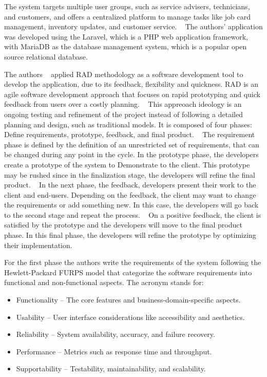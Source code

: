 The system targets multiple user groups, such as service advisers, technicians, and customers, and offers a centralized platform to manage tasks like job card management, inventory updates, and customer service. ~\cite{MAS_MOTORS}
The authors' application was developed using the Laravel, which is a PHP web application framework, with MariaDB as the database management system, which is a popular open source relational database.

The authors ~\citet{MAS_MOTORS} applied \ac{RAD} methodology as a software development tool to develop the application, due to its feedback, flexibility and quickness.
\ac{RAD} is an agile software development approach that focuses on rapid prototyping and quick feedback from users over a costly planning. ~\cite{rapid_app_development}
This appreoach ideology is an ongoing testing and refinement of the project instead of following a detailed planning and design, such as traditional models.
It is composed of four phases: Define requirements, prototype, feedback, and final product. ~\cite{rapid_app_development}
The requirement phase is defined by the definition of an unrestricted set of requirements, that can be changed during any point in the cycle. 
In the prototype phase, the developers create a prototype of the system to Demonstrate to the client. 
This prototype may be rushed since in the finalization stage, the developers will refine the final product. ~\cite{rapid_app_development}
In the next phase, the feedback, developers present their work to the client and end-users.
Depending on the feedback, the client may want to change the requirements or add something new. In this case, the developers will go back to the second stage and repeat the process. ~\cite{rapid_app_development}
On a positive feedback, the client is satisfied by the prototype and the developers will move to the final product phase.
In this final phase, the developers will refine the prototype by optimizing their implementation. ~\cite{rapid_app_development}

For the first phase the authors write the requirements of the system following the Hewlett-Packard \ac{FURPS} model that categorize the software requirements into functional and non-functional aspects.
The acronym stands for:

\begin{itemize}
  \item Functionality – The core features and business-domain-specific aspects.
  \item Usability – User interface considerations like accessibility and aesthetics.
  \item Reliability – System availability, accuracy, and failure recovery.
  \item Performance – Metrics such as response time and throughput.
  \item Supportability – Testability, maintainability, and scalability.
\end{itemize}

